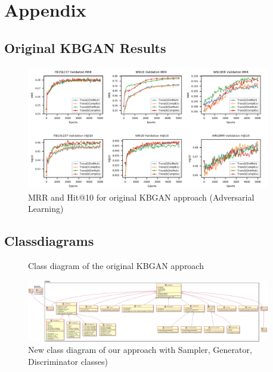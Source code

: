 %
\chapter{Appendix}
\label{sec:appendix}

\section{Original KBGAN Results}
\label{sec:appendix:originalkbganresults}

\begin{figure}
  \centering
    \includegraphics[width=0.95\textwidth]{appendices/figures/original_results.png}
  \caption{MRR and Hit@10 for original KBGAN approach \cite{cai2017kbgan} (Adversarial Learning)}
  \label{fig:originalkbganresults}
\end{figure}

\clearpage

\section{Classdiagrams}
\label{sec:appendix:classdiagrams}

\begin{figure}
  \centering
  \caption{Class diagram of the original \ac{KBGAN} approach}
  \label{fig:overview}
\end{figure}

\begin{figure}
  \centering
    \includegraphics[width=0.95\textwidth]{appendices/figures/NewClassDiagram.png}
  \caption{New class diagram of our approach with Sampler, Generator, Discriminator classes)}
  \label{fig:overview}
\end{figure}

